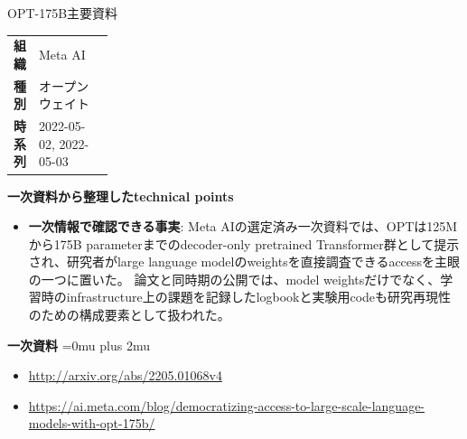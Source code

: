 \begin{technicalnote}{OPT-175B}{主要資料}
\begingroup
\begin{tabularx}{\linewidth}{@{}>{\bfseries}p{0.22\linewidth}X@{}}
組織 & Meta AI \\
種別 & オープンウェイト \\
時系列 & 2022-05-02, 2022-05-03 \\
\end{tabularx}
\smallskip
{\bfseries 一次資料から整理したtechnical points}
\begin{itemize}[leftmargin=1.5em,itemsep=0.35em]
\item \textbf{一次情報で確認できる事実}: Meta AIの選定済み一次資料では、OPTは125Mから175B parameterまでのdecoder-only pretrained Transformer群として提示され、研究者がlarge language modelのweightsを直接調査できるaccessを主眼の一つに置いた。 論文と同時期の公開では、model weightsだけでなく、学習時のinfrastructure上の課題を記録したlogbookと実験用codeも研究再現性のための構成要素として扱われた。
\end{itemize}
\begin{minipage}{\linewidth}
\begin{samepage}
{\bfseries 一次資料}
\begingroup\sloppy
\Urlmuskip=0mu plus 2mu\relax
\begin{itemize}[leftmargin=1.5em,itemsep=0.25em]
\item {\scriptsize\url{http://arxiv.org/abs/2205.01068v4}}
\item {\scriptsize\url{https://ai.meta.com/blog/democratizing-access-to-large-scale-language-models-with-opt-175b/}}
\end{itemize}
\endgroup
\end{samepage}
\end{minipage}
\endgroup
\end{technicalnote}
\medskip

